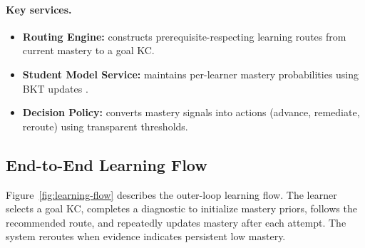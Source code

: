 \documentclass{article}
\begin{document}
\paragraph{Key services.}
\begin{itemize}
    \item \textbf{Routing Engine:} constructs prerequisite-respecting learning routes from current mastery to a goal KC.
    \item \textbf{Student Model Service:} maintains per-learner mastery probabilities using BKT updates \cite{corbett1995}.
    \item \textbf{Decision Policy:} converts mastery signals into actions (advance, remediate, reroute) using transparent thresholds.
\end{itemize}

\FloatBarrier

\subsection{End-to-End Learning Flow}
Figure~\ref{fig:learning-flow} describes the outer-loop learning flow. The learner selects a goal KC, completes
a diagnostic to initialize mastery priors, follows the recommended route, and repeatedly updates mastery after
each attempt. The system reroutes when evidence indicates persistent low mastery.
\end{document}
